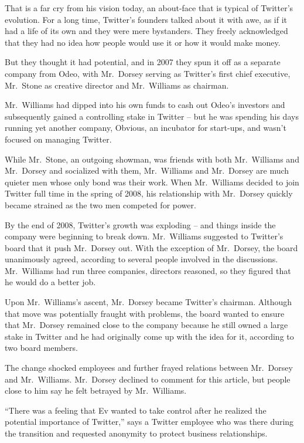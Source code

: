 ﻿\documentclass[12pt]{article}
\begin{document}
That is a far cry from his vision today, an about-face that is typical of Twitter's evolution. For a
long time, Twitter's founders talked about it with awe, as if it had a life of its own and they were
mere bystanders. They freely acknowledged that they had no idea how people would use it or how it
would make money.

But they thought it had potential, and in 2007 they spun it off as a separate company from Odeo,
with Mr.~Dorsey serving as Twitter's first chief executive, Mr.~Stone as creative director and
Mr.~Williams as chairman.

Mr.~Williams had dipped into his own funds to cash out Odeo's investors and subsequently gained a
controlling stake in Twitter -- but he was spending his days running yet another company, Obvious,
an incubator for start-ups, and wasn't focused on managing Twitter.

While Mr.~Stone, an outgoing showman, was friends with both Mr.~Williams and Mr.~Dorsey and
socialized with them, Mr.~Williams and Mr.~Dorsey are much quieter men whose only bond was their
work. When Mr.~Williams decided to join Twitter full time in the spring of 2008, his relationship
with Mr.~Dorsey quickly became strained as the two men competed for power.

By the end of 2008, Twitter's growth was exploding -- and things inside the company were beginning
to break down. Mr.~Williams suggested to Twitter's board that it push Mr.~Dorsey out. With the
exception of Mr.~Dorsey, the board unanimously agreed, according to several people involved in the
discussions. Mr.~Williams had run three companies, directors reasoned, so they figured that he would
do a better job.

Upon Mr.~Williams's ascent, Mr.~Dorsey became Twitter's chairman. Although that move was potentially
fraught with problems, the board wanted to ensure that Mr.~Dorsey remained close to the company
because he still owned a large stake in Twitter and he had originally come up with the idea for it,
according to two board members.

The change shocked employees and further frayed relations between Mr.~Dorsey and Mr.~Williams.
Mr.~Dorsey declined to comment for this article, but people close to him say he felt betrayed by
Mr.~Williams.

``There was a feeling that Ev wanted to take control after he realized the potential importance of
Twitter,'' says a Twitter employee who was there during the transition and requested anonymity to
protect business relationships.
\end{document}
